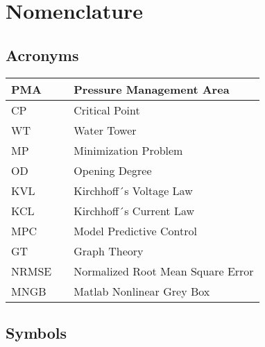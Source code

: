 \chapter{Nomenclature}

\section*{Acronyms}
	
	\begin{tabular}{|l c l|} \hline
		PMA 		&&	Pressure Management Area		\\ \hline
		CP			&&	Critical Point					\\ \hline
		WT			&&	Water Tower						\\ \hline
		MP		  	&&	Minimization Problem			\\ \hline
		OD 			&&  Opening Degree					\\ \hline
		KVL 		&&  Kirchhoff´s Voltage Law 		\\ \hline
		KCL 		&&  Kirchhoff´s Current Law			\\ \hline
		MPC			&&  Model Predictive Control		\\ \hline
		GT			&&  Graph Theory					\\ \hline
		NRMSE	    &&  Normalized Root Mean Square Error	\\ \hline
		MNGB		&&  Matlab Nonlinear Grey Box	\\ \hline
	\end{tabular}
\section*{Symbols}

